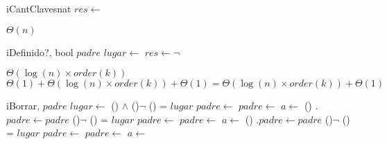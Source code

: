 \begin{Algoritmos}
  \nuevoAlgo
  \begin{algoritmo}{iCantClaves}{}{nat}
    $res \gets$  
  \end{algoritmo}
  \datosAlgoritmo{} %
  {} %
  {} %
  {$\Theta(n)$} %
  {} %

  \nuevoAlgo
  \begin{algoritmo}{iDefinido?}{, }{bool}
     $padre$ \;
     $lugar \gets$  
    $res \gets \neg$  
  \end{algoritmo}
  \datosAlgoritmo{} %
  {} %
  {} %
  {$\Theta(\log(n) \times order(k))$} %
  {$\Theta(1) + \Theta(\log(n) \times order(k)) + \Theta(1) = \Theta(\log(n) \times order(k)) + \Theta(1)$} %

  \begin{algoritmo}{iBorrar}{, }{}
     $padre$ \;
     $lugar \gets$  
    \uIf(){ $\land$ }{
      \eIf(){$\neg$ }{
        \eIf(){ = $lugar$}{
          $padre \gets$  
        }{
          $padre \gets$  
        }
         
      }{
        $a \gets$ \nil{} 
      }
    }\uElseIf(){}{
      .$padre \gets padre$ 
      \eIf(){$\neg$ }{
        \eIf(){ = $lugar$}{
          $padre \gets$  
        }{
          $padre \gets$  
        }
         
      }{
        $a \gets$  
      }
    }\uElseIf(){}{
      .$padre \gets padre$ 
      \eIf(){$\neg$ }{
        \eIf(){ = $lugar$}{
          $padre \gets$  
        }{
          $padre \gets$  
        }
         
      }{
        $a \gets$  
      }
    }
  \end{algoritmo}


\end{Algoritmos}
